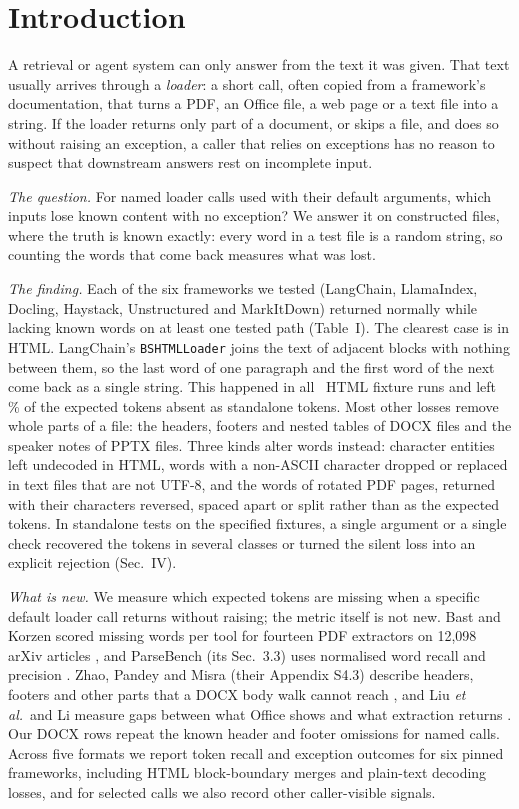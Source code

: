 \documentclass[aps,pre,twocolumn,superscriptaddress,nofootinbib,10pt]{revtex4-2}
\begin{document}
\section{Introduction}
A retrieval or agent system can only answer from the text it was given. That text usually arrives through a \emph{loader}: a short call, often copied from a framework's documentation, that turns a PDF, an Office file, a web page or a text file into a string. If the loader returns only part of a document, or skips a file, and does so without raising an exception, a caller that relies on exceptions has no reason to suspect that downstream answers rest on incomplete input.

\emph{The question.} For named loader calls used with their default arguments, which inputs lose known content with no exception? We answer it on constructed files, where the truth is known exactly: every word in a test file is a random string, so counting the words that come back measures what was lost.

\emph{The finding.} Each of the six frameworks we tested (LangChain, LlamaIndex, Docling, Haystack, Unstructured and MarkItDown) returned normally while lacking known words on at least one tested path (Table~I). The clearest case is in HTML. LangChain's \texttt{BSHTMLLoader} joins the text of adjacent blocks with nothing between them, so the last word of one paragraph and the first word of the next come back as a single string. This happened in all \lcHtmlRuns\ HTML fixture runs and left \lcHtmlLossPct\% of the expected tokens absent as standalone tokens. Most other losses remove whole parts of a file: the headers, footers and nested tables of DOCX files and the speaker notes of PPTX files. Three kinds alter words instead: character entities left undecoded in HTML, words with a non-ASCII character dropped or replaced in text files that are not UTF-8, and the words of rotated PDF pages, returned with their characters reversed, spaced apart or split rather than as the expected tokens. In standalone tests on the specified fixtures, a single argument or a single check recovered the tokens in several classes or turned the silent loss into an explicit rejection (Sec.~IV).

\emph{What is new.} We measure which expected tokens are missing when a specific default loader call returns without raising; the metric itself is not new. Bast and Korzen scored missing words per tool for fourteen PDF extractors on 12,098 arXiv articles \cite{bast2017}, and ParseBench (its Sec.~3.3) uses normalised word recall and precision \cite{parsebench}. Zhao, Pandey and Misra (their Appendix S4.3) describe headers, footers and other parts that a DOCX body walk cannot reach \cite{zhao2026}, and Liu \emph{et al.}\ and Li measure gaps between what Office shows and what extraction returns \cite{liu2026,li2026}. Our DOCX rows repeat the known header and footer omissions for named calls. Across five formats we report token recall and exception outcomes for six pinned frameworks, including HTML block-boundary merges and plain-text decoding losses, and for selected calls we also record other caller-visible signals.
\end{document}
